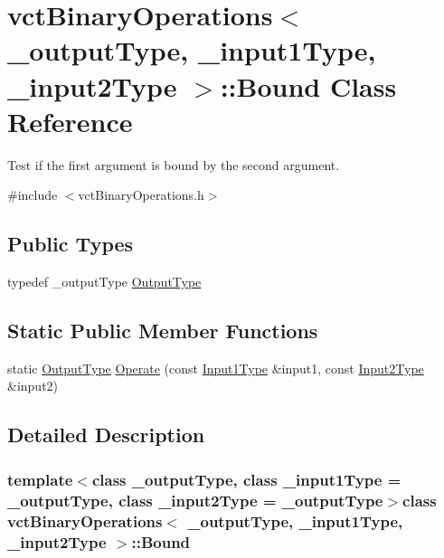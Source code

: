 \hypertarget{classvct_binary_operations_1_1_bound}{\section{vct\-Binary\-Operations$<$ \-\_\-output\-Type, \-\_\-input1\-Type, \-\_\-input2\-Type $>$\-:\-:Bound Class Reference}
\label{classvct_binary_operations_1_1_bound}
}


Test if the first argument is bound by the second argument.  




{\ttfamily \#include $<$vct\-Binary\-Operations.\-h$>$}

\subsection*{Public Types}
\begin{DoxyCompactItemize}
\item 
typedef \-\_\-output\-Type \hyperlink{classvct_binary_operations_1_1_bound_a5a4b69346c1fd30825140a406c6bb079}{Output\-Type}
\end{DoxyCompactItemize}
\subsection*{Static Public Member Functions}
\begin{DoxyCompactItemize}
\item 
static \hyperlink{classvct_binary_operations_1_1_bound_a5a4b69346c1fd30825140a406c6bb079}{Output\-Type} \hyperlink{classvct_binary_operations_1_1_bound_ae88f2288f191c8304144c01a64c324f1}{Operate} (const \hyperlink{classvct_binary_operations_a5e56a66a012d6a28c539a08a0021c45e}{Input1\-Type} \&input1, const \hyperlink{classvct_binary_operations_a929119af557a04a16b4d854981e49e1b}{Input2\-Type} \&input2)
\end{DoxyCompactItemize}


\subsection{Detailed Description}
\subsubsection*{template$<$class \-\_\-output\-Type, class \-\_\-input1\-Type = \-\_\-output\-Type, class \-\_\-input2\-Type = \-\_\-output\-Type$>$class vct\-Binary\-Operations$<$ \-\_\-output\-Type, \-\_\-input1\-Type, \-\_\-input2\-Type $>$\-::\-Bound}

